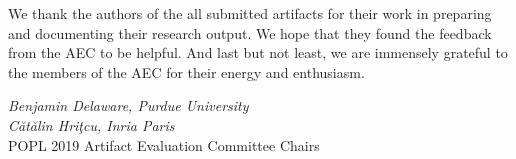 We thank the authors of the all submitted artifacts for their work in
preparing and documenting their research output. We hope that they
found the feedback from the AEC to be helpful. And last but not least,
we are immensely grateful to the members of the AEC for their energy
and enthusiasm.

\begin{flushright}
\textit{Benjamin Delaware, Purdue University} \\
\textit{C\u{a}t\u{a}lin Hri\c{t}cu, Inria Paris} \\
POPL 2019 Artifact Evaluation Committee Chairs
\medskip \\
\end{flushright}

\newpage
